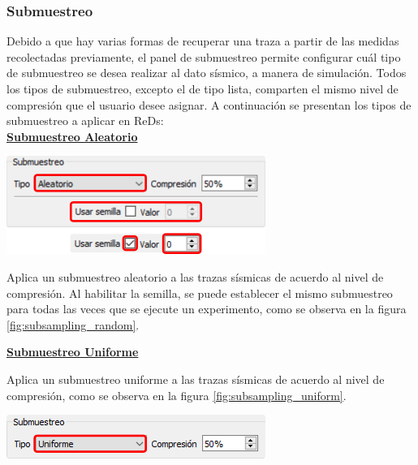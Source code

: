 \documentclass[12pt,twoside,letter]{ol-softwaremanual}
\newcommand*\circled[1]{\tikz[baseline=(char.base)]{
            \node[shape=circle,draw,inner sep=2pt] (char) {#1};}}
\newenvironment{Figure}
  {\par\medskip\noindent\minipage{\linewidth}}
  {\endminipage\par\medskip}
\begin{document}
\subsubsection{Submuestreo}\label{subsampling}

Debido a que hay varias formas de recuperar una traza a partir de las medidas recolectadas previamente, el panel de submuestreo \circled{4} permite configurar cuál tipo de submuestreo se desea realizar al dato sísmico, a manera de simulación. Todos los tipos de submuestreo, excepto el de tipo lista, comparten el mismo nivel de compresión que el usuario desee asignar. A continuación se presentan los tipos de submuestreo a aplicar en ReDs:\\

\underline{\textbf{Submuestreo Aleatorio}}

\begin{multicols}{2}
\begin{Figure}
	\centering
	\includegraphics[width=0.8\linewidth]{subsampling-random.png}
	\label{fig:subsampling_random}
\end{Figure}

Aplica un submuestreo aleatorio a las trazas sísmicas de acuerdo al nivel de compresión. Al habilitar la semilla, se puede establecer el mismo submuestreo para todas las veces que se ejecute un experimento, como se observa en la figura \ref{fig:subsampling_random}.

\end{multicols}

\underline{\textbf{Submuestreo Uniforme}}

\begin{multicols}{2}

Aplica un submuestreo uniforme a las trazas sísmicas de acuerdo al nivel de compresión, como se observa en la figura \ref{fig:subsampling_uniform}.

\begin{Figure}
    \centering
    \includegraphics[width=0.8\linewidth]{subsampling-uniform.png}
    \label{fig:subsampling_uniform}
\end{Figure}

\end{multicols}
\end{document}
